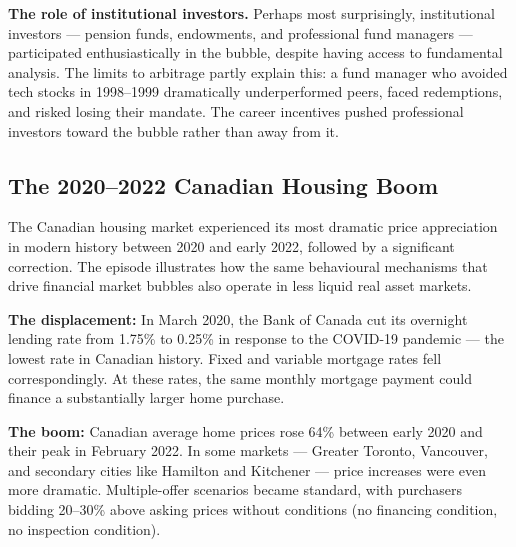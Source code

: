 \documentclass[12pt, letterpaper]{article}
\begin{document}
\textbf{The role of institutional investors.} Perhaps most surprisingly, institutional investors --- pension funds, endowments, and professional fund managers --- participated enthusiastically in the bubble, despite having access to fundamental analysis. The limits to arbitrage partly explain this: a fund manager who avoided tech stocks in 1998--1999 dramatically underperformed peers, faced redemptions, and risked losing their mandate. The career incentives pushed professional investors toward the bubble rather than away from it.


\subsection{The 2020--2022 Canadian Housing Boom}


The Canadian housing market experienced its most dramatic price appreciation in modern history between 2020 and early 2022, followed by a significant correction. The episode illustrates how the same behavioural mechanisms that drive financial market bubbles also operate in less liquid real asset markets.

\textbf{The displacement:} In March 2020, the Bank of Canada cut its overnight lending rate from 1.75\% to 0.25\% in response to the COVID-19 pandemic --- the lowest rate in Canadian history. Fixed and variable mortgage rates fell correspondingly. At these rates, the same monthly mortgage payment could finance a substantially larger home purchase.

\textbf{The boom:} Canadian average home prices rose 64\% between early 2020 and their peak in February 2022. In some markets --- Greater Toronto, Vancouver, and secondary cities like Hamilton and Kitchener --- price increases were even more dramatic. Multiple-offer scenarios became standard, with purchasers bidding 20--30\% above asking prices without conditions (no financing condition, no inspection condition).
\end{document}
